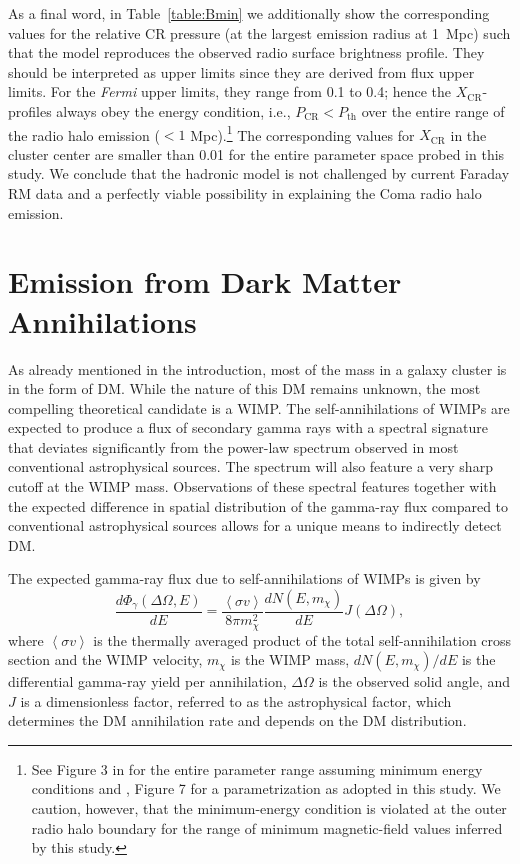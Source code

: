 \documentclass[12pt,manuscript]{aastex}
\newcommand{\expval}[1]{\left\langle #1 \right\rangle}
\newcommand{\CR}{\mathrm{CR}}
\begin{document}
As a final word, in Table~\ref{table:Bmin} we additionally show the corresponding values for the
relative CR pressure (at the largest emission radius at 1~Mpc) such that the model reproduces the
observed radio surface brightness profile. They should be interpreted as upper limits since they
are derived from flux upper limits. For the {\em Fermi} upper limits, they range from 0.1 to 0.4;
hence the $X_{\CR}$-profiles always obey the energy condition, i.e., $P_{\CR} < P_{\mathrm{th}}$
over the entire range of the radio halo emission ($< 1$ Mpc).\footnote{See Figure 3 in
\citet{article:PfrommerEnsslin:2004a} for the entire parameter range assuming minimum energy
conditions and \citet{article:PfrommerEnsslin:2004b}, Figure 7 for a parametrization as adopted in
this study.  We caution, however, that the minimum-energy condition is violated at the outer radio
halo boundary for the range of minimum magnetic-field values inferred by this study.} The
corresponding values for $X_\CR$ in the cluster center are smaller than 0.01 for the entire
parameter space probed in this study. We conclude that the hadronic model is not challenged by
current Faraday RM data and a perfectly viable possibility in explaining the Coma radio halo
emission.

%
%

\section{Emission from Dark Matter Annihilations}
As already mentioned in the introduction, most of the mass in a galaxy cluster is in the form of
DM. While the nature of this DM remains unknown, the most compelling theoretical candidate is a
WIMP. The self-annihilations of WIMPs are expected to produce a flux of secondary gamma rays with a
spectral signature that deviates significantly from the power-law spectrum observed in most
conventional astrophysical sources. The spectrum will also feature a very sharp cutoff at the WIMP
mass. Observations of these spectral features together with the expected difference in spatial
distribution of the gamma-ray flux compared to conventional astrophysical sources allows for a
unique means to indirectly detect DM.

The expected gamma-ray flux due to self-annihilations of WIMPs is given by 
\begin{equation}
\frac{d\Phi_{\gamma}(\Delta\Omega,E)}{dE}=
\frac{\expval{\sigma v}}{8\pi m_{\chi}^{2}}\frac{dN(E,m_{\chi})}{dE} J(\Delta\Omega),
\label{eqn:WIMPflux}
\end{equation}
where $\expval{\sigma v}$ is the thermally averaged product of the total self-annihilation cross
section and the WIMP velocity, $m_{\chi}$ is the WIMP mass, $dN(E,m_{\chi})/dE$ is the differential
gamma-ray yield per annihilation, $\Delta\Omega$ is the observed solid angle, and $J$ is a
dimensionless factor, referred to as the astrophysical factor, which determines the DM annihilation
rate and depends on the DM distribution.
\end{document}
